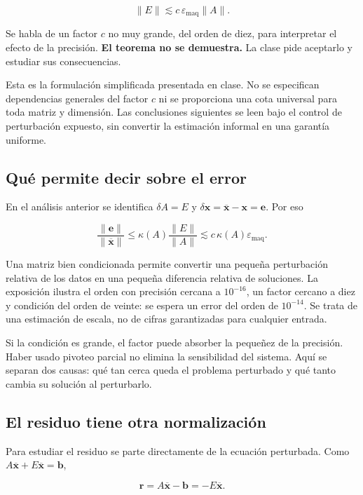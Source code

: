 \documentclass[12pt,a4paper]{article}
\begin{document}
\[
\|E\|\lesssim c\,\varepsilon_{\mathrm{maq}}\|A\|.
\]

Se habla de un factor $c$ no muy grande, del orden de diez, para interpretar el efecto de la precisión. \textbf{El teorema no se demuestra.} La clase pide aceptarlo y estudiar sus consecuencias.

\begin{notebox}
Esta es la formulación simplificada presentada en clase. No se especifican dependencias generales del factor $c$ ni se proporciona una cota universal para toda matriz y dimensión. Las conclusiones siguientes se leen bajo el control de perturbación expuesto, sin convertir la estimación informal en una garantía uniforme.
\end{notebox}

\subsection{Qué permite decir sobre el error}

En el análisis anterior se identifica $\delta A=E$ y $\delta\mathbf x=\overline{\mathbf x}-\mathbf x=\mathbf e$. Por eso

\[
\frac{\|\mathbf e\|}{\|\overline{\mathbf x}\|}
\le\kappa(A)\frac{\|E\|}{\|A\|}
\lesssim c\,\kappa(A)\varepsilon_{\mathrm{maq}}.
\]

Una matriz bien condicionada permite convertir una pequeña perturbación relativa de los datos en una pequeña diferencia relativa de soluciones. La exposición ilustra el orden con precisión cercana a $10^{-16}$, un factor cercano a diez y condición del orden de veinte: se espera un error del orden de $10^{-14}$. Se trata de una estimación de escala, no de cifras garantizadas para cualquier entrada.

Si la condición es grande, el factor puede absorber la pequeñez de la precisión. Haber usado pivoteo parcial no elimina la sensibilidad del sistema. Aquí se separan dos causas: qué tan cerca queda el problema perturbado y qué tanto cambia su solución al perturbarlo.

\subsection{El residuo tiene otra normalización}

Para estudiar el residuo se parte directamente de la ecuación perturbada. Como $A\overline{\mathbf x}+E\overline{\mathbf x}=\mathbf b$,

\[
\mathbf r=A\overline{\mathbf x}-\mathbf b=-E\overline{\mathbf x}.
\]
\end{document}
